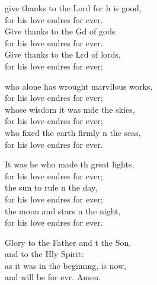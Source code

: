 \settowidth{\versewidth}{O give thanks to the Lord for he is good, *}
\begin{psalmverse}%
  \begin{patverse}
 give thanks to the Lord for h is good,\Med\\
    for his love endres for ever.\\
Give thanks to the Gd of gods\Med\\
    for his love endres for ever.\\
Give thanks to the Lrd of lords,\Med\\
    for his love endres for ever;

who alone has wrought marvllous works,\Med\\
    for his love endres for ever;\\
whose wisdom it was mde the skies,\Med\\
    for his love endres for ever;\\
who fixed the earth firmly n the seas,\Med\\
    for his love endres for ever.

It was he who made th great lights,\Med\\
    for his love endres for ever;\\
the sun to rule \pointup{\i}n the day,\Med\\
    for his love endres for ever;\\
the moon and stars \pointup{\i}n the night,\Med\\
    for his love endres for ever.

Glory to the Father and t the Son,\Med\\
    and to the Hly Spirit:\\
as it was in the beginn\pointup{\i}ng, is now,\Med\\
    and will be for evr. Amen.
  \end{patverse}
\end{psalmverse}
